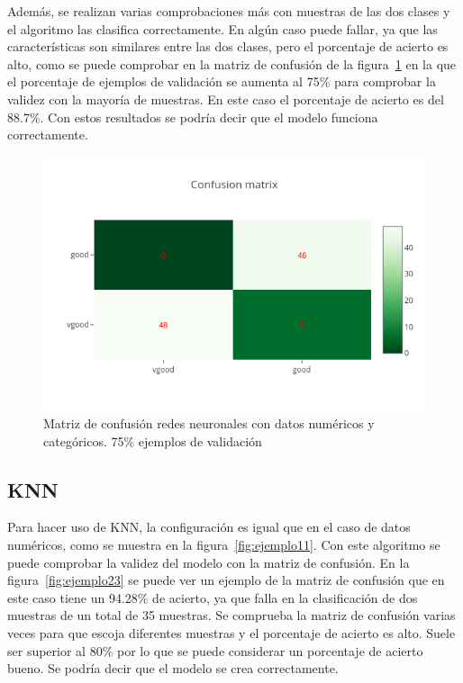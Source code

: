 \documentclass[a4paper, 12pt]{book}
\begin{document}
Además, se realizan varias comprobaciones más con muestras de las dos clases y el algoritmo las clasifica correctamente. 
En algún caso puede fallar, ya que las características son similares entre las dos clases, pero el porcentaje de acierto es alto, como se puede comprobar en la matriz de confusión de la figura~\ref{fig:ejemplo22} en la que el porcentaje de ejemplos de validación se aumenta al 75\% para comprobar la validez con la mayoría de muestras. En este caso el porcentaje de acierto es del 88.7\%. Con estos resultados se podría decir que el modelo funciona correctamente.

\begin{figure}
	\centering
	\includegraphics[width=12cm, keepaspectratio]{img/cm_numycat_rn2.png}
	\caption{Matriz de confusión redes neuronales con datos numéricos y categóricos. 75\% ejemplos de validación} 	
	\label{fig:ejemplo22}
\end{figure}

\subsection{KNN}
\label{subsec:knn2}

Para hacer uso de KNN, la configuración es igual que en el caso de datos numéricos, como se muestra en la figura~\ref{fig:ejemplo11}. Con este algoritmo se puede comprobar la validez del modelo con la matriz de confusión. En la figura~\ref{fig:ejemplo23} se puede ver un ejemplo de la matriz de confusión que en este caso tiene un 94.28\% de acierto, ya que falla en la clasificación de dos muestras de un total de 35 muestras. Se comprueba la matriz de confusión varias veces para que escoja diferentes muestras y el porcentaje de acierto es alto. Suele ser superior al 80\% por lo que se puede considerar un porcentaje de acierto bueno. Se podría decir que el modelo se crea correctamente.
\end{document}
